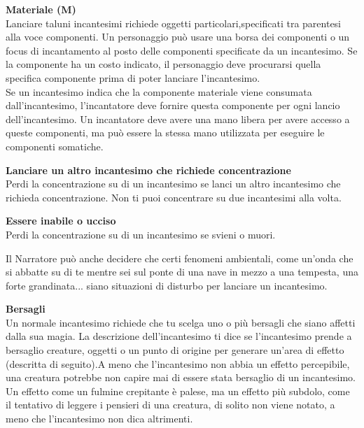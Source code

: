\begin{multicols}{2}
\textbf{Materiale (M)}\\
Lanciare taluni incantesimi richiede oggetti particolari,specificati tra parentesi alla voce componenti. Un personaggio può usare una borsa dei componenti o un focus di incantamento al posto delle componenti specificate da un incantesimo. Se la componente ha un costo indicato, il personaggio deve procurarsi quella specifica componente prima di poter lanciare l'incantesimo.\\
Se un incantesimo indica che la componente materiale viene consumata dall'incantesimo, l'incantatore deve fornire questa componente per ogni lancio dell'incantesimo.
Un incantatore deve avere una mano libera per avere accesso a queste componenti, ma può essere la stessa mano utilizzata per eseguire le componenti somatiche.\\

\medskip

\textbf{Lanciare un altro incantesimo che richiede concentrazione}\\
Perdi la concentrazione su di un incantesimo se lanci un altro incantesimo che richieda concentrazione. Non ti puoi concentrare su due incantesimi alla volta. \\

\medskip

\textbf{Essere inabile o ucciso}\\
Perdi la concentrazione su di un incantesimo se svieni o muori.\\

\medskip

Il Narratore può anche decidere che certi fenomeni ambientali, come un'onda che si abbatte su di te mentre sei sul ponte di una nave in mezzo a una tempesta, una forte grandinata... siano situazioni di disturbo per lanciare un incantesimo.\\

\medskip

\textbf{Bersagli}\\
Un normale incantesimo richiede che tu scelga uno o più bersagli che siano affetti dalla sua magia. La descrizione dell'incantesimo ti dice se l'incantesimo prende a bersaglio creature, oggetti o un punto di origine per generare un'area di effetto (descritta di seguito).A meno che l'incantesimo non abbia un effetto percepibile, una creatura potrebbe non capire mai di essere stata bersaglio di un incantesimo. Un effetto come un fulmine crepitante è palese, ma un effetto più subdolo, come il tentativo di leggere i pensieri di una creatura, di solito non viene notato, a meno che l'incantesimo non dica altrimenti.\\


\end{multicols}
